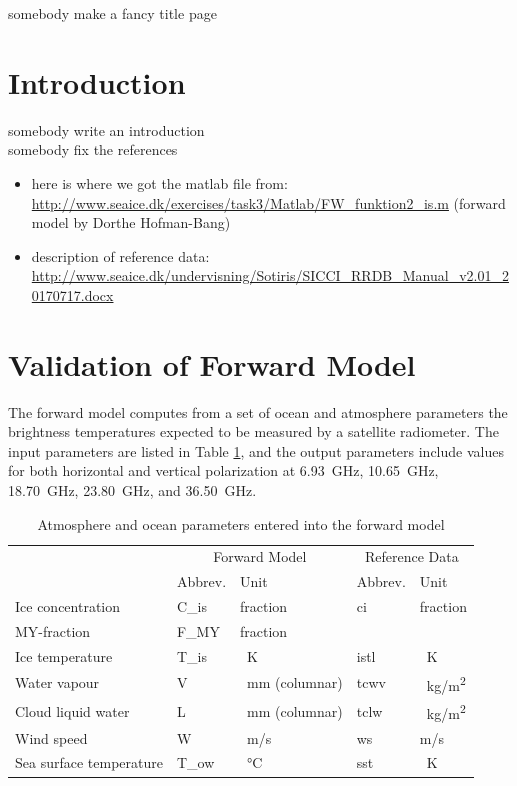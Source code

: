 \documentclass[11pt, a4paper]{article}
\begin{document}
\begin{titlepage}
\centering
{somebody make a fancy title page}
\end{titlepage}






\section*{Introduction}

somebody write an introduction \\
somebody fix the references

\begin{itemize}
\item here is where we got the matlab file from: \url{http://www.seaice.dk/exercises/task3/Matlab/FW_funktion2_is.m} (forward model by Dorthe Hofman-Bang)
\item description of reference data: \url{http://www.seaice.dk/undervisning/Sotiris/SICCI_RRDB_Manual_v2.01_20170717.docx}
\end{itemize}




\section{Validation of Forward Model}

The forward model computes from a set of ocean and atmosphere parameters the brightness temperatures expected to be measured by a satellite radiometer. The input parameters are listed in Table \ref{tab:input_parameters}, and the output parameters include values for both horizontal and vertical polarization at \SI{6.93}{GHz}, \SI{10.65}{GHz}, \SI{18.70}{GHz}, \SI{23.80}{GHz}, and \SI{36.50}{GHz}.

\begin{table}[h!]
\centering
\begin{tabular}{@{}p{4cm} p{1.8cm}p{2.8cm}p{1.8cm}p{1.8cm}@{}}
\tabularnewline
& \multicolumn{2}{c}{Forward Model} & \multicolumn{2}{c}{Reference Data}
\tabularnewline
\cmidrule(r{1em}){2-3} \cmidrule(l{1em}){4-5}
& Abbrev. & Unit & Abbrev. & Unit
\tabularnewline
\midrule
Ice concentration	& C\_is	& fraction		& ci	& fraction	\\
MY-fraction		& F\_MY	& fraction		& 	& 		\\
Ice temperature		& T\_is	& \SI{}{K}	& istl	& \SI{}{K}	\\
Water vapour		& V	& \SI{}{mm} (columnar)	& tcwv	& \SI{}{kg/m^2}	\\
Cloud liquid water	& L	& \SI{}{mm} (columnar)	& tclw	& \SI{}{kg/m^2}	\\
Wind speed		& W	& \SI{}{m/s}		& ws	& m/s		\\
Sea surface temperature	& T\_ow	& \SI{}{\degreeCelsius}	& sst	& \SI{}{K}	\\
\midrule
\end{tabular}
\caption{Atmosphere and ocean parameters entered into the forward model}
\label{tab:input_parameters}
\end{table}
\end{document}
